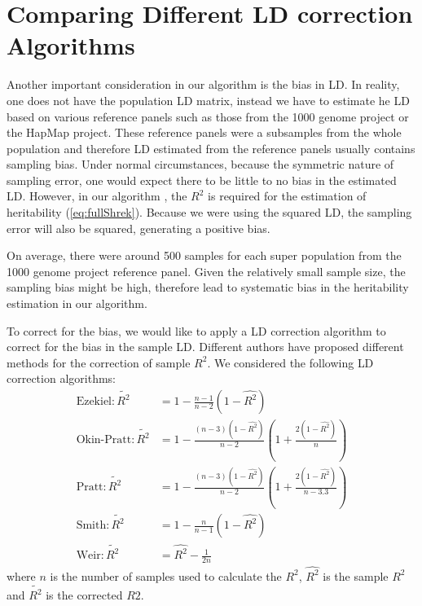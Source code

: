 	\section{Comparing Different LD correction Algorithms}
		\label{sec:ldSim}
		Another important consideration in our algorithm is the bias in \gls{LD}.
		In reality, one does not have the population \gls{LD} matrix, instead we have to estimate he \gls{LD} based on various reference panels such as those from the 1000 genome project\citep{Project2012} or the HapMap project\citep{Altshuler2010}.
		These reference panels were a subsamples from the whole population and therefore \gls{LD} estimated from the reference panels usually contains sampling bias.
		Under normal circumstances, because the symmetric nature of sampling error, one would expect there to be little to no bias in the estimated \gls{LD}.
		However, in our algorithm , the $R^2$ is required for the estimation of heritability (\cref{eq:fullShrek}).
		Because we were using the squared \gls{LD}, the sampling error will also be squared, generating a positive bias. 
		
		On average, there were around 500 samples for each super population from the 1000 genome project reference panel.
		Given the relatively small sample size, the sampling bias might be high, therefore lead to systematic bias in the heritability estimation in our algorithm.
		
		To correct for the bias, we would like to apply a \gls{LD} correction algorithm to correct for the bias in the sample \gls{LD}.
		Different authors \citep{Weir1980,Wang2007} have proposed different methods for the correction of sample $R^2$. 
		We considered the following \gls{LD} correction algorithms:
		\begin{align}
		\text{Ezekiel}: \tilde{R^2}&= 1-\frac{n-1}{n-2}(1-\hat{R^2})\label{eq:ezekiel} \\
		\text{Okin-Pratt}: \tilde{R^2}&=1-\frac{(n-3)(1-\hat{R^2})}{n-2}(1+\frac{2(1-\hat{R^2})}{n})\label{eq:okin} \\
		\text{Pratt}: \tilde{R^2}&=1-\frac{(n-3)(1-\hat{R^2})}{n-2}(1+\frac{2(1-\hat{R^2})}{n-3.3})\label{eq:pratt} \\
		\text{Smith}: \tilde{R^2}&=1-\frac{n}{n-1}(1-\hat{R^2}) \label{eq:smith}\\
		\text{Weir}: \tilde{R^2}&=\hat{R^2}-\frac{1}{2n} \label{eq:weir}
		\end{align}
		where $n$ is the number of samples used to calculate the $R^2$, $\hat{R^2}$ is the sample $R^2$ and $\tilde{R^2}$ is the corrected $R2$.
		
